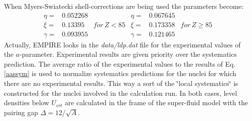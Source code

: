 \documentclass[twocolumn,amsmath,amssymb,10pt,groupedaddress,letter]{revtex4}
\begin{document}
When Myers-Swiatecki shell-corrections are being used the parameters
become:\begin{equation}
\begin{array}{ccc}
\eta= & 0.052268\\
\xi= & 0.13395 & for\, Z<85\\
\gamma= & 0.093955\end{array}\begin{array}{ccc}
\eta= & 0.067645\\
\xi= & 0.173358 & for\, Z\geq85\\
\gamma= & 0.121465\end{array}\end{equation}
Actually, EMPIRE looks in the \emph{data/ldp.dat} file for the experimental
values of the $a$-parameter. Experimental results are given priority
over the systematics prediction. The average ratio of the experimental
values to the results of Eq. \ref{aassym} is used to normalize systematics
predictions for the nuclei for which there are no experimental results.
This way a sort of the \char`\"{}local systematics\char`\"{} is constructed
for the nuclei involved in the calculation run. In both cases, level
densities below $U_{crt}$ are calculated
in the frame of the super-fluid model \cite{igna} with the pairing
gap $\Delta=12/\sqrt{A}$.

\medskip
\end{document}
